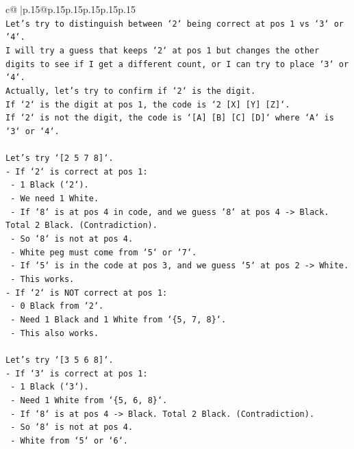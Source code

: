 \documentclass{article}
\begin{document}
{\begin{supertabular}{c@{$\;$}|p{.15\linewidth}@{}p{.15\linewidth}p{.15\linewidth}p{.15\linewidth}p{.15\linewidth}p{.15\linewidth}}
{{{\\ 
\texttt{Let's try to distinguish between `2` being correct at pos 1 vs `3` or `4`.} \\
\texttt{I will try a guess that keeps `2` at pos 1 but changes the other digits to see if I get a different count, or I can try to place `3` or `4`.} \\
\texttt{Actually, let's try to confirm if `2` is the digit.} \\
\texttt{If `2` is the digit at pos 1, the code is `2 {[}X{]} {[}Y{]} {[}Z{]}`.} \\
\texttt{If `2` is not the digit, the code is `{[}A{]} {[}B{]} {[}C{]} {[}D{]}` where `A` is `3` or `4`.} \\
\\ 
\texttt{Let's try `{[}2 5 7 8{]}`.} \\
\texttt{{-} If `2` is correct at pos 1:} \\
\texttt{    {-} 1 Black (`2`).} \\
\texttt{    {-} We need 1 White.} \\
\texttt{    {-} If `8` is at pos 4 in code, and we guess `8` at pos 4 {-}> Black. Total 2 Black. (Contradiction).} \\
\texttt{    {-} So `8` is not at pos 4.} \\
\texttt{    {-} White peg must come from `5` or `7`.} \\
\texttt{    {-} If `5` is in the code at pos 3, and we guess `5` at pos 2 {-}> White.} \\
\texttt{    {-} This works.} \\
\texttt{{-} If `2` is NOT correct at pos 1:} \\
\texttt{    {-} 0 Black from `2`.} \\
\texttt{    {-} Need 1 Black and 1 White from `\{5, 7, 8\}`.} \\
\texttt{    {-} This also works.} \\
\\ 
\texttt{Let's try `{[}3 5 6 8{]}`.} \\
\texttt{{-} If `3` is correct at pos 1:} \\
\texttt{    {-} 1 Black (`3`).} \\
\texttt{    {-} Need 1 White from `\{5, 6, 8\}`.} \\
\texttt{    {-} If `8` is at pos 4 {-}> Black. Total 2 Black. (Contradiction).} \\
\texttt{    {-} So `8` is not at pos 4.} \\
\texttt{    {-} White from `5` or `6`.} \\
}}}
\end{supertabular}}
\end{document}
